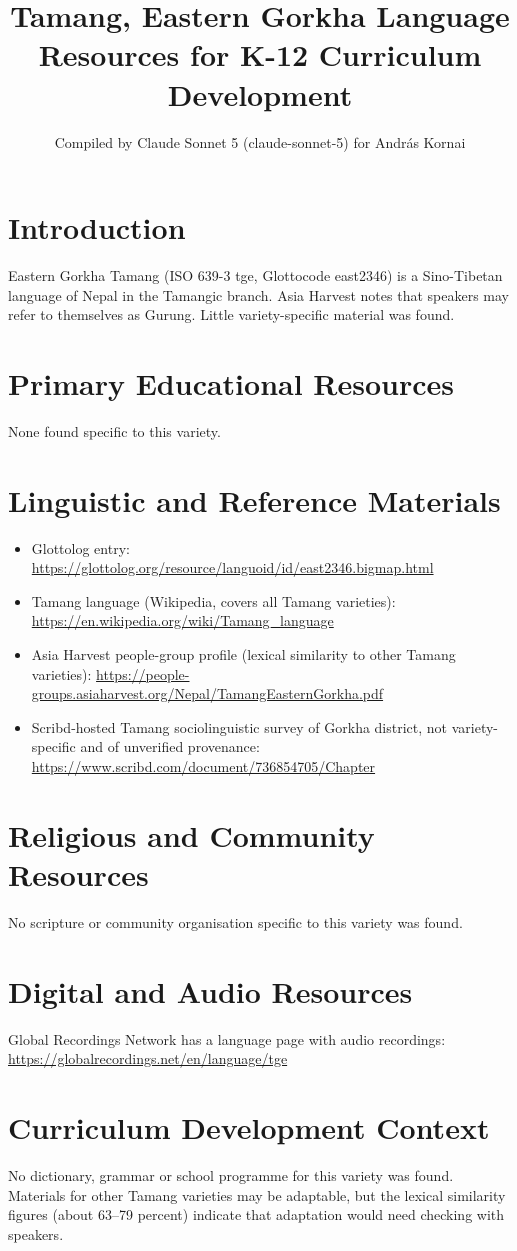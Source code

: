 \documentclass[12pt]{article}
\title{Tamang, Eastern Gorkha Language Resources for K-12 Curriculum Development}
\author{Compiled by Claude Sonnet 5 (claude-sonnet-5) for Andr\'as Kornai}
\date{}
\begin{document}
\maketitle

\section{Introduction}
Eastern Gorkha Tamang (ISO 639-3 tge, Glottocode east2346) is a Sino-Tibetan language of Nepal in the Tamangic branch. Asia Harvest notes that speakers may refer to themselves as Gurung. Little variety-specific material was found.

\section{Primary Educational Resources}
None found specific to this variety.

\section{Linguistic and Reference Materials}
\begin{itemize}
\item Glottolog entry: \url{https://glottolog.org/resource/languoid/id/east2346.bigmap.html}
\item Tamang language (Wikipedia, covers all Tamang varieties): \url{https://en.wikipedia.org/wiki/Tamang_language}
\item Asia Harvest people-group profile (lexical similarity to other Tamang varieties): \url{https://people-groups.asiaharvest.org/Nepal/TamangEasternGorkha.pdf}
\item Scribd-hosted Tamang sociolinguistic survey of Gorkha district, not variety-specific and of unverified provenance: \url{https://www.scribd.com/document/736854705/Chapter}
\end{itemize}

\section{Religious and Community Resources}
No scripture or community organisation specific to this variety was found.

\section{Digital and Audio Resources}
Global Recordings Network has a language page with audio recordings: \url{https://globalrecordings.net/en/language/tge}

\section{Curriculum Development Context}
No dictionary, grammar or school programme for this variety was found. Materials for other Tamang varieties may be adaptable, but the lexical similarity figures (about 63--79 percent) indicate that adaptation would need checking with speakers.
\end{document}
